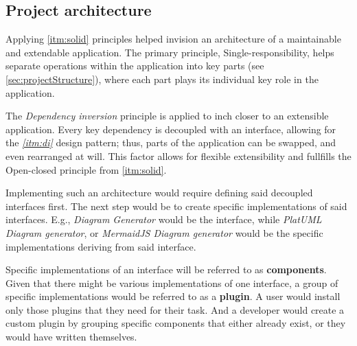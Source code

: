 \subsection{Project architecture}

Applying \ref{itm:solid} principles helped invision an architecture of a maintainable and extendable application.
The primary principle, Single-responsibility, helps separate operations within the application into key parts (see \ref{sec:projectStructure}), where each part plays its individual key role in the application.

The \textit{Dependency inversion} principle is applied to inch closer to an extensible application. Every key dependency is decoupled with an interface, allowing for the \textit{\ref{itm:di}} design pattern; thus, parts of the application can be swapped, and even rearranged at will. This factor allows for flexible extensibility and fullfills the Open-closed principle from \ref{itm:solid}.

Implementing such an architecture would require defining said decoupled interfaces first.
The next step would be to create specific implementations of said interfaces. E.g., \textit{Diagram Generator} would be the interface, while \textit{PlatUML Diagram generator}, or \textit{MermaidJS Diagram generator} would be the specific implementations deriving from said interface.

Specific implementations of an interface will be referred to as \textbf{components}. Given that there might be various implementations of one interface, a group of specific implementations would be referred to as a \textbf{plugin}. A user would install only those plugins that they need for their task. And a developer would create a custom plugin by grouping specific components that either already exist, or they would have written themselves.

